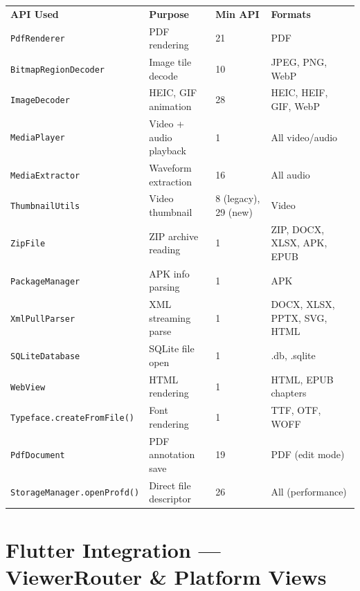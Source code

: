 \documentclass[12pt,a4paper]{report}
\newcommand{\ra}[1]{\renewcommand{\arraystretch}{#1}}
\newcommand{\THC}[1]{\rowcolor{P3}\color{white}\bfseries #1}
\newcommand{\PB}{\newpage}
\begin{document}
\begin{center}\ra{1.35}
\begin{tabular}{L{4.0cm} L{3.6cm} C{2.2cm} L{4.0cm}}
\THC{API Used} & \THC{Purpose} & \THC{Min API} & \THC{Formats} \\
 \texttt{PdfRenderer} & PDF rendering & 21 & PDF \\
 \texttt{BitmapRegionDecoder} & Image tile decode & 10 & JPEG, PNG, WebP \\
 \texttt{ImageDecoder} & HEIC, GIF animation & 28 & HEIC, HEIF, GIF, WebP \\
 \texttt{MediaPlayer} & Video + audio playback & 1 & All video/audio \\
 \texttt{MediaExtractor} & Waveform extraction & 16 & All audio \\
 \texttt{ThumbnailUtils} & Video thumbnail & 8 (legacy), 29 (new) & Video \\
 \texttt{ZipFile} & ZIP archive reading & 1 & ZIP, DOCX, XLSX, APK, EPUB \\
 \texttt{PackageManager} & APK info parsing & 1 & APK \\
 \texttt{XmlPullParser} & XML streaming parse & 1 & DOCX, XLSX, PPTX, SVG, HTML \\
 \texttt{SQLiteDatabase} & SQLite file open & 1 & .db, .sqlite \\
 \texttt{WebView} & HTML rendering & 1 & HTML, EPUB chapters \\
 \texttt{Typeface.createFromFile()} & Font rendering & 1 & TTF, OTF, WOFF \\
 \texttt{PdfDocument} & PDF annotation save & 19 & PDF (edit mode) \\
 \texttt{StorageManager.openProfd()} & Direct file descriptor & 26 & All (performance) \\
\end{tabular}
\end{center}

\PB

\chapter{Flutter Integration — ViewerRouter \& Platform Views}
\end{document}
